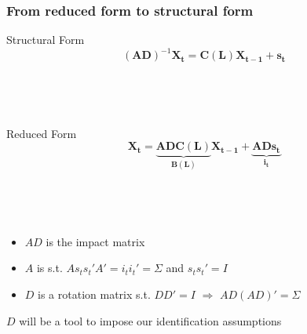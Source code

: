 \documentclass{beamer}
\begin{document}
\begin{frame}
	\frametitle{From reduced form to structural form}
	\label{identification}
	
Structural Form	
\begin{equation}
(\mathbf{AD})^{-1}
    \mathbf{X_{t}}
= \mathbf{C(L)} 
\mathbf{X_{t-1}}
+ \mathbf{s_t}
\end{equation}

\

\

Reduced Form
\begin{equation}
\mathbf{X_{t}}
= \underbrace{\mathbf{AD} \mathbf{C(L)}}_\text{$\mathbf{B(L)}$} 
\mathbf{X_{t-1}}
+ \underbrace{\mathbf{AD} \mathbf{s_t}}_\text{$\mathbf{i_t}$}
\end{equation}

\

\

\begin{itemize}
	\item $AD$ is the impact matrix
	\item $A$ is s.t. $As_t s_t' A' = i_t i_t' = \Sigma$ and $s_t s_t' = I$
	\item $D$ is a rotation matrix s.t. $DD' = I$ $\Rightarrow$ $AD(AD)' = \Sigma$
\end{itemize}

$D$ will be a tool to impose our identification assumptions \hyperlink{Technicalities}{}

\end{frame}
\end{document}
